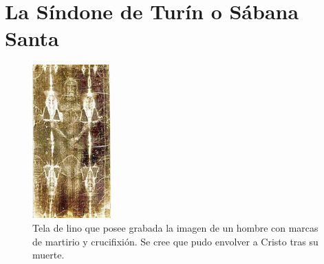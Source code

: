 \section{La Síndone de Turín o Sábana Santa} \label{app:sindone}

\begin{figure}[H]
    \centering
    \includegraphics[width=0.27\textwidth]{sindone.jpg}
    \caption{Tela de lino que posee grabada la imagen de un hombre con marcas de martirio y crucifixión. Se cree que pudo envolver a Cristo tras su muerte.\cite{RefWorks:72}} %
\end{figure}


